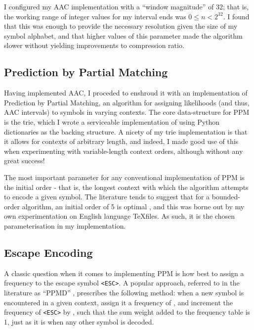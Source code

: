 \documentclass[11pt]{article}
\newcommand{\code}[1]{\texttt{#1}}
\begin{document}
I configured my AAC implementation with a \enquote{window magnitude} of 32; that is, the working range of integer values for my interval ends was $0 \leq n < 2^{32}$. I found that this was enough to provide the necessary resolution given the size of my symbol alphabet, and that higher values of this parameter made the algorithm slower without yielding improvements to compression ratio.

\subsection{Prediction by Partial Matching}

Having implemented AAC, I proceded to enshroud it with an implementation of Prediction by Partial Matching, an algorithm for assigning likelihoods (and thus, AAC intervals) to symbols in varying contexts. The core data-structure for PPM is the trie, which I wrote a serviceable implementation of using Python dictionaries as the backing structure. A nicety of my trie implementation is that it allows for contexts of arbitrary length, and indeed, I made good use of this when experimenting with variable-length context orders, although without any great success!

The most important parameter for any conventional implementation of PPM is the initial order - that is, the longest context with which the algorithm attempts to encode a given symbol. The literature tends to suggest that for a bounded-order algorithm, an initial order of 5 is optimal \cite{cleary1997unbounded}, and this was borne out by my own experimentation on English language \TeX \thinspace files. As such, it is the chosen parameterisation in my implementation.

\subsection{Escape Encoding}

A classic question when it comes to implementing PPM is how best to assign a frequency to the escape symbol \code{<ESC>}. A popular approach, referred to in the literature as \enquote{PPMD} \cite{howard1992practical}, prescribes the following method: when a new symbol is encountered in a given context, assign it a frequency of , and increment the frequency of \code{<ESC>} by , such that the sum weight added to the frequency table is 1, just as it is when any other symbol is decoded.
\end{document}
